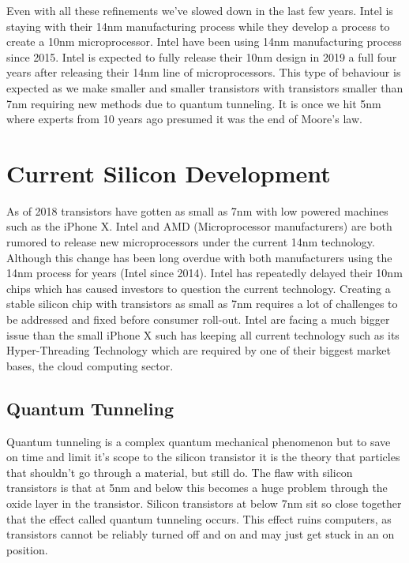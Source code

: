 \documentclass[journal]{IEEEtran}
\begin{document}
Even with all these refinements we've slowed down in the last few years. Intel is staying with their 14nm manufacturing process while they develop a process to create a 10nm microprocessor. Intel have been using 14nm manufacturing process since 2015. Intel is expected to fully release their 10nm design in 2019 a full four years after releasing their 14nm line of microprocessors. This type of behaviour is expected as we make smaller and smaller transistors with transistors smaller than 7nm requiring new methods due to quantum tunneling. It is once we hit 5nm where experts from 10 years ago presumed it was the end of Moore's law. \cite{591665}

\section{Current Silicon Development}
As of 2018 transistors have gotten as small as 7nm with low powered machines such as the iPhone X. Intel and AMD (Microprocessor manufacturers) are both rumored to release new microprocessors under the current 14nm technology. Although this change has been long overdue with both manufacturers using the 14nm process for years (Intel since 2014). Intel has repeatedly delayed their 10nm chips \cite{dent_2018} which has caused investors to question the current technology. Creating a stable silicon chip with transistors as small as 7nm requires a lot of challenges to be addressed and fixed before consumer roll-out. Intel are facing a much bigger issue than the small iPhone X such has keeping all current technology such as its Hyper-Threading Technology which are required by one of their biggest market bases, the cloud computing sector. 

\subsection{Quantum Tunneling}
Quantum tunneling is a complex quantum mechanical phenomenon \cite{70394920140101} but to save on time and limit it's scope to the silicon transistor it is the theory that particles that shouldn't go through a material, but still do. The flaw with silicon transistors is that at 5nm and below this becomes a huge problem through the oxide layer in the transistor. Silicon transistors at below 7nm sit so close together that the effect called quantum tunneling occurs. This effect ruins computers, as transistors cannot be reliably turned off and on and may just get stuck in an on position.
\end{document}
